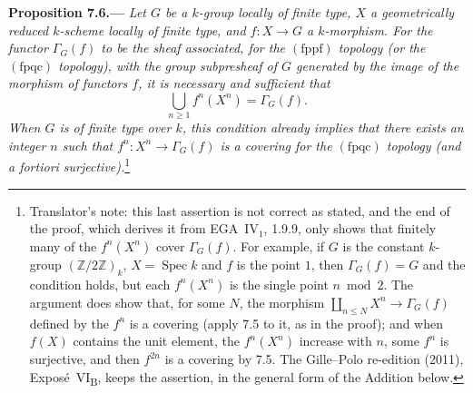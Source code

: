 
\medskip
{}\label{prop:sga3-VIB-7.6}%
\noindent\textbf{Proposition 7.6.---}
\emph{Let \(G\) be a \(k\)-group locally of finite type, \(X\) a
geometrically reduced \(k\)-scheme locally of finite type, and
\(f:X\to G\) a \(k\)-morphism. For the functor \(\Gamma_G(f)\) to
be the sheaf associated, for the \((\mathrm{fppf})\) topology
\textup{(}or the \((\mathrm{fpqc})\) topology\textup{)}, with the
group subpresheaf of \(G\) generated by the image of the morphism
of functors \(f\), it is necessary and sufficient that}
\label{form:sga3-VIB-7.6-union}%
\[
  \bigcup_{n\geq1}f^n(X^n)=\Gamma_G(f).
\]
\emph{When \(G\) is of finite type over \(k\), this condition
already implies that there exists an integer \(n\) such that
\(f^n:X^n\to\Gamma_G(f)\) is a covering for the
\((\mathrm{fpqc})\) topology \textup{(}and a fortiori
surjective\textup{)}.}\footnote{Translator's note: this last assertion is not correct as stated, and the end of the proof, which
derives it from EGA~IV\(_1\), 1.9.9, only shows that finitely many of the \(f^n(X^n)\) cover
\(\Gamma_G(f)\). For example, if \(G\) is the constant \(k\)-group \((\mathbb Z/2\mathbb Z)_k\),
\(X=\operatorname{Spec}k\) and \(f\) is the point \(1\), then \(\Gamma_G(f)=G\) and the condition holds, but
each \(f^n(X^n)\) is the single point \(n\bmod 2\). The argument does show that, for some \(N\), the morphism
\(\coprod_{n\leq N}X^n\to\Gamma_G(f)\) defined by the \(f^n\) is a covering (apply 7.5 to it, as in the
proof); and when \(f(X)\) contains the unit element, the \(f^n(X^n)\) increase with \(n\), some \(f^n\) is
surjective, and then \(f^{2n}\) is a covering by 7.5. The Gille--Polo re-edition (2011),
Exposé~VI\textsubscript{B}, keeps the assertion, in the general form of the Addition below.}


